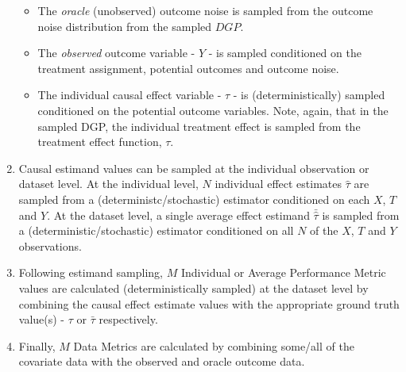 \documentclass[../main.tex]{subfiles}
\begin{document}
\begin{enumerate}
\begin{itemize}
   \item The \textit{oracle} (unobserved) outcome noise is sampled from the outcome noise distribution from the sampled $DGP$.

   \item The \textit{observed} outcome variable - $Y$ - is sampled conditioned on the treatment assignment, potential outcomes and outcome noise.
    
   \item The individual causal effect variable - $\tau$ - is (deterministically) sampled conditioned on the potential outcome variables. Note, again, that in the sampled DGP, the individual treatment effect is sampled from the treatment effect function, $\tau$.
  
\end{itemize}

\item Causal estimand values can be sampled at the individual observation or dataset level. At the individual level, $N$ individual effect estimates $\hat{\tau}$ are sampled from a (deterministc/stochastic) estimator conditioned on each $X$, $T$ and $Y$. At the dataset level, a single average effect estimand $\bar{\hat{\tau}}$ is sampled from a (deterministic/stochastic) estimator conditioned on all $N$ of the $X$, $T$ and $Y$ observations.

\item Following estimand sampling, $M$ Individual or Average Performance Metric values are calculated (deterministically sampled) at the dataset level by combining the causal effect estimate values with the appropriate ground truth value(s) - $\tau$ or $\bar{\tau}$ respectively.

\item Finally, $M$ Data Metrics are calculated by combining some/all of the covariate data with the observed and oracle outcome data.

\end{enumerate}
\end{document}
